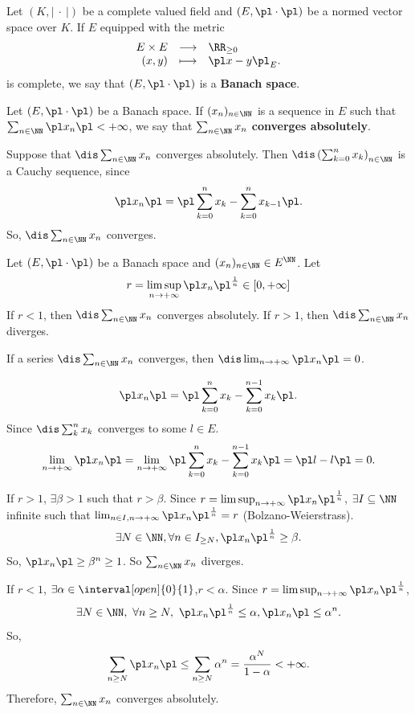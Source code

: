 \begin{definitionenv}
    Let $(K,\left| \ \cdot\ \right|)$ be a complete valued field and $(E,\pl\cdot\pl)$ be a normed vector space over $K$. If $E$ equipped with the metric
    $$\begin{array}{rcl}
        E\times E &\longrightarrow & \RR_{\ge 0}\\
        (x,y) &\longmapsto & \pl x-y\pl_E.
    \end{array}$$
    is complete, we say that $(E,\pl \cdot\pl )$ is a \textbf{Banach space}.

    Let $(E,\pl\cdot\pl)$ be a Banach space. If $(x_n)_{n\in\NN}$ is a sequence in $E$ such that $\sum_{n\in\NN}\pl x_n\pl<+\infty$, we say that $\sum_{n\in\NN}x_n$ \textbf{converges absolutely}.
\end{definitionenv}
\begin{remark}
    Suppose that $\dis \sum_{n\in \NN}x_n$ converges absolutely. Then $\dis \left(\sum_{k=0}^{n}x_k\right)_{n\in\NN}$ is a Cauchy sequence, since 
    $$ \pl x_n \pl=\pl \sum_{k=0}^{n}x_k- \sum_{k=0}^n x_{k-1}\pl.$$
    So, $\dis \sum_{n\in\NN}x_n$ converges.
\end{remark}
\begin{theoremenv}
    Let $(E,\pl \cdot\pl)$ be a Banach space and $(x_n)_{n\in \NN}\in E^\NN$. Let
    $$ r=\limsup_{n\rightarrow +\infty}\pl x_n\pl^{\frac{1}{n}}\in [0,+\infty]$$
    If $r<1$, then $\dis \sum_{n\in \NN}x_n$ converges absolutely.
    \newline
    If $r>1$, then $\dis \sum_{n\in \NN}x_n$ diverges.
\end{theoremenv}
\begin{lemmaenv}
    If a series $\dis \sum_{n\in \NN}x_n$ converges, then $\dis \lim_{n\rightarrow+\infty}\pl x_n\pl =0$.
\end{lemmaenv}
\begin{proofenv}[of lemma]
    $$ \pl x_n\pl =\pl \sum_{k=0}^{n}x_k-\sum_{k=0}^{n-1}x_k\pl .$$
    Since $\dis \sum_{k}^n x_k$ converges to some $l\in E$.
    $$ \lim_{n\rightarrow+\infty}\pl x_n\pl =\lim_{n\rightarrow+\infty}\pl \sum_{k=0}^{n}x_k- \sum_{k=0}^{n-1}x_k\pl =\pl l-l\pl=0.$$
\end{proofenv}
\begin{proofenv}[of theorem]
    If $r>1$, $\exists \beta>1$ such that $r>\beta$. Since $r=\limsup_{n\rightarrow +\infty}\pl x_n\pl ^{\frac{1}{n}}$, $\exists I\subseteq \NN$ infinite such that $\lim_{n\in I,n\rightarrow+\infty}\pl x_n \pl^{\frac{1}{n}}=r$ (Bolzano-Weierstrass).
    $$\exists N\in \NN, \forall n\in I_{\ge N}, \pl x_n\pl^{\frac{1}{n}}\ge \beta.$$
    So, $\pl x_n\pl \ge \beta^n\ge 1$. So $\sum_{n\in \NN}x_n$ diverges.

    If $r<1$, $\exists\alpha\in \interval[open]{0}{1}$,$r<\alpha$. Since $r=\limsup_{n\rightarrow +\infty}\pl x_n\pl ^{\frac{1}{n}}$,
    $$\exists N\in \NN,\ \forall n\ge N,\ \pl x_n\pl^{\frac{1}{n}}\le \alpha, \pl x_n\pl \le \alpha^n.$$
    So,
    $$ \sum_{n\ge N}\pl x_n\pl \le \sum_{n\ge N}\alpha^n=\frac{\alpha^N}{1-\alpha}<+\infty.$$
    Therefore, $\sum_{n\in \NN}x_n$ converges absolutely.
\end{proofenv}
